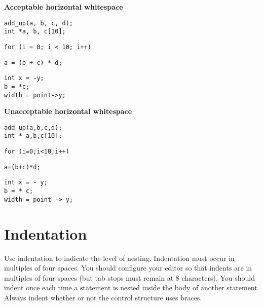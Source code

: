 \documentclass{article}
\begin{document}
\begin{multicols}{2}
\textbf{Acceptable horizontal whitespace}
\begin{lstlisting}
add_up(a, b, c, d);
int *a, b, c[10];
\end{lstlisting}

\begin{lstlisting}
for (i = 0; i < 10; i++)
\end{lstlisting}

\begin{lstlisting}
a = (b + c) * d;
\end{lstlisting}

\begin{lstlisting}
int x = -y;
b = *c;
width = point->y;
\end{lstlisting}
\vfill
\columnbreak

\textbf{Unacceptable horizontal whitespace}
\begin{lstlisting}
add_up(a,b,c,d);
int * a,b,c[10];
\end{lstlisting}

\begin{lstlisting}
for (i=0;i<10;i++)
\end{lstlisting}

\begin{lstlisting}
a=(b+c)*d;
\end{lstlisting}

\begin{lstlisting}
int x = - y;
b = * c;
width = point -> y;
\end{lstlisting}
\end{multicols}

\clearpage
\section{Indentation}
Use indentation to indicate the level of nesting.
Indentation must occur in multiples of four spaces.
You should configure your editor so that indents are in multiples of four spaces (but tab stops must remain at 8 characters).
You should indent once each time a statement is nested inside the body of another statement.
Always indent whether or not the control structure uses braces.
\end{document}
